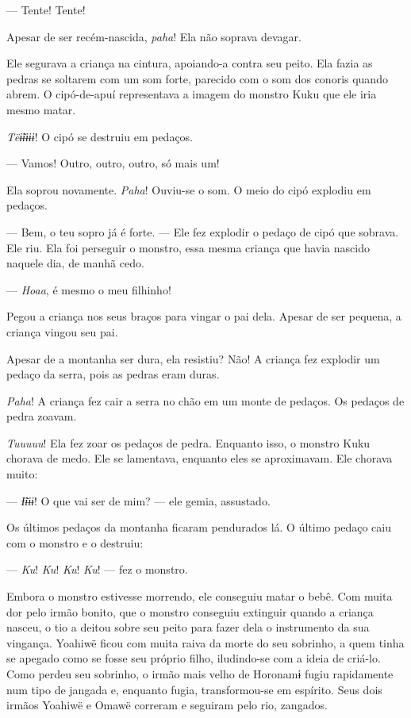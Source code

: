 --- Tente! Tente! 

Apesar de ser recém-nascida, \textit{paha}! Ela não soprava devagar. 
   
Ele segurava a criança na cintura, apoiando-a contra seu peito. Ela 
fazia as pedras se soltarem com um som forte, parecido com o som dos
conoris quando abrem. O cipó-de-apuí representava a imagem do monstro
Kuku que ele iria mesmo matar. 

\textit{Tëɨ̃ɨɨɨɨ}! O cipó se destruiu em pedaços. 

--- Vamos! Outro, outro, outro, só mais um!

Ela soprou novamente. \textit{Paha}! Ouviu-se o som. O meio do cipó explodiu em pedaços. 

--- Bem, o teu sopro já é forte. --- Ele fez explodir o pedaço de cipó
que sobrava. Ele riu. Ela foi perseguir o monstro, essa mesma criança
que havia nascido naquele dia, de manhã cedo. 

--- \textit{Hoaa}, é mesmo o meu filhinho! 

Pegou a criança nos seus braços para vingar o pai dela. Apesar de ser
pequena, a criança vingou seu pai. 

Apesar de a montanha ser dura, ela resistiu? Não! A criança fez explodir um
pedaço da serra, pois as pedras eram duras. 

\textit{Paha}! A criança fez cair a serra no chão em um monte de pedaços. Os
pedaços de pedra zoavam.

\textit{Tuuuuu}! Ela fez zoar os pedaços de pedra. Enquanto isso, o monstro Kuku
chorava de medo. Ele se lamentava, enquanto eles se aproximavam. Ele
chorava muito:

--- \textit{Ɨ̃ɨɨɨ}! O que vai ser de mim? --- ele gemia, assustado. 

Os últimos pedaços da montanha ficaram pendurados lá. O último pedaço
caiu com o monstro e o destruiu: 

--- \textit{Ku}! \textit{Ku}! \textit{Ku}! \textit{Ku}! --- fez o monstro. 

Embora o monstro estivesse morrendo, ele conseguiu matar o bebê. Com
muita dor pelo irmão bonito, que o monstro conseguiu extinguir quando a
criança nasceu, o tio a deitou sobre seu peito para fazer dela o
instrumento da sua vingança. Yoahiwë ficou com muita raiva da morte do
seu sobrinho, a quem tinha se apegado como se fosse seu próprio filho,
iludindo-se com a ideia de criá-lo. Como perdeu seu sobrinho, o irmão
mais velho de Horonamɨ fugiu rapidamente num tipo de jangada e, enquanto
fugia, transformou-se em espírito. Seus dois irmãos Yoahiwë e Omawë correram e seguiram pelo rio, zangados. 


